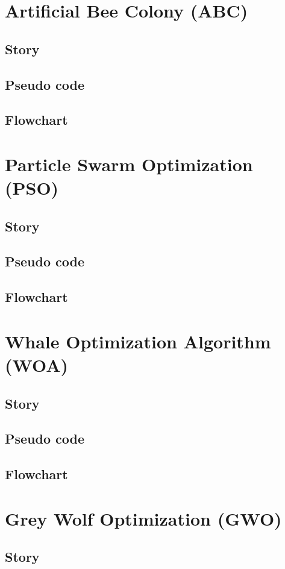\documentclass[border=0.2cm]{report}
\begin{document}
\chapter{Artificial Bee Colony (ABC)}
\section{Story}
\section{Pseudo code}
\section{Flowchart}

\chapter{Particle Swarm Optimization (PSO)}
\section{Story}
\section{Pseudo code}
\section{Flowchart}

\chapter{Whale Optimization Algorithm (WOA)}
\section{Story}
\section{Pseudo code}
\section{Flowchart}

\chapter{Grey Wolf Optimization (GWO)}
\section{Story}
\end{document}

